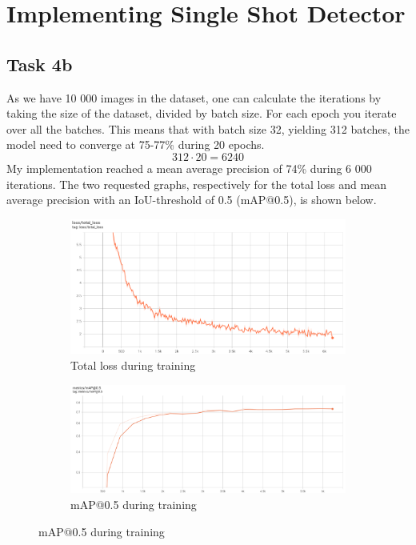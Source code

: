 \clearpage
\section{Implementing Single Shot Detector}
\subsection*{Task 4b}
As we have 10 000 images in the dataset, one can calculate the iterations by taking the size of the dataset, divided by batch size. 
For each epoch you iterate over all the batches. This means that with batch size 32, yielding 312 batches, the model need to converge at 75-77\% during 20 epochs. 
\begin{equation*}
    312 \cdot 20 = 6240
\end{equation*}
My implementation reached a mean average precision of 74\% during 6 000 iterations.
The two requested graphs, respectively for the total loss and mean average precision with an IoU-threshold of 0.5 (mAP@0.5), is shown below. 

\begin{figure}[h!]
    \centering
    \begin{subfigure}[b]{\textwidth}
        \centering
        \includegraphics[width=\textwidth]{Images/task4b_total_loss.png}
        \caption*{Total loss during training}
    \end{subfigure}
    \hfill
    \begin{subfigure}[b]{\textwidth}
        \centering
        \includegraphics[width=\textwidth]{Images/task4b_map05.png}
        \caption*{mAP@0.5 during training}
    \end{subfigure}
\end{figure}

